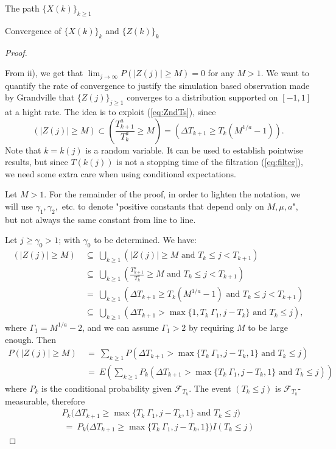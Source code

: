 \documentclass[12pt]{article}
\begin{document}
\begin{section}{The path $\{X(k)\}_{k\ge1}$ }
\begin{subsection}{Convergence of $\{X(k)\}_k$ and $\{Z(k)\}_k$}
\begin{proof}
\   

From ii), we get that $ \lim_{j \rightarrow \infty } P(|Z(j)| \ge M) = 0 $ for any $M > 1$. We want to quantify the rate of convergence to justify the simulation based observation made by Grandville that $\{Z(j)\}_{j \ge 1}$ converges to a distribution supported on $[-1,1]$ at a hight rate. The idea is to exploit (\ref{eq:ZndTs}), since 
$$
(|Z(j)| \ge M) \subset ( \frac{T_{k+1}^a}{T_{k}^a} \ge M) = 
 ( \Delta T_{k+1} \ge T_{k}(M^{1/a} -1) ).
$$
Note that $k=k(j)$ is a random variable. It can be used to establish pointwise results, but since $T(k(j))$ is not a stopping time of the filtration (\ref{eq:filter}), we need some extra care when using conditional expectations.

Let $M>1$. For the remainder of the proof, in order to lighten the notation, we will use $\gamma_1, \gamma_2,$ etc. to denote "positive constants that depend only on $M, \mu, a$", but not always the same constant from line to line.

Let $j \ge \gamma_0 > 1$; with $\gamma_0$ to be determined. We have:
\begin{align*}
(|Z(j)| \ge M) &~\subseteq~ \bigcup_{k \ge 1} (|Z(j)| \ge M \text{ and } T_k \le j < T_{k+1}) \\
&~\subseteq~ \bigcup_{k \ge 1} ( \frac{T_{k+1}^a}{T_{k}^a} \ge M \text{ and } T_k \le j < T_{k+1}) \\
&~=~ \bigcup_{k \ge 1} ( \Delta T_{k+1} \ge T_{k}(M^{1/a} -1) \text{ and } T_k \le j < T_{k+1}) \\
&~\subseteq~ \bigcup_{k \ge 1} ( \Delta T_{k+1} > \max\{1, T_{k} \ \Gamma_1, j - T_k\} \text{ and } T_k \le j ) ,
\end{align*}
where $\Gamma_1 = M^{1/a}-2$, and we can assume $\Gamma_1 > 2$ by requiring $M$ to be large enough. Then
\begin{align*}
P(|Z(j)| \ge M) &~=~ \sum_{k \ge 1} P( \Delta T_{k+1} > \max\{T_{k} \ \Gamma_1, j - T_k,1\} \text{ and } T_k \le j ) \\
&~=~ E\left( \sum_{k \ge 1} P_k( \Delta T_{k+1} > \max\{T_{k} \ \Gamma_1, j - T_k, 1\} \text{ and } T_k \le j ) \right) 
\end{align*}
where  $P_{k}$ is the conditional probability given $\mathcal{F}_{T_k}$. The event $(T_k \le j)$ is $\mathcal{F}_{T_k}$-measurable, therefore
\begin{align*}
& P_k\Big( \Delta T_{k+1} \ge \max\{T_{k} \ \Gamma_1, j - T_k,1\} \text{ and } T_k \le j \Big)  &\\
& ~=~ P_k\Big( \Delta T_{k+1} \ge \max\{T_{k} \ \Gamma_1, j - T_k,1\}\Big) I(T_k \le j ) &
\end{align*}


\end{proof}
\end{subsection}
\end{section}
\end{document}
